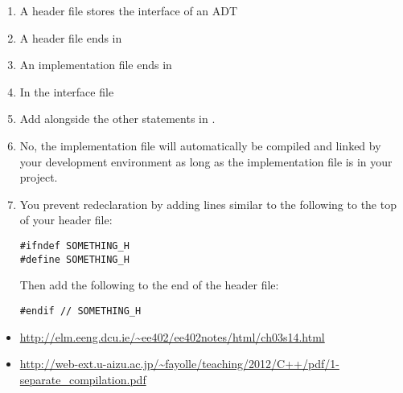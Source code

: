 
\begin{enumerate}
	\item A header file stores the interface of an ADT

	\item A header file ends in 

	\item An implementation file ends in 

	\item In the interface file

	\item Add  alongside the other  statements in .

	\item No, the implementation file will automatically be compiled and linked by your development environment as long as the implementation file is in your project.

	\item You prevent redeclaration by adding lines similar to the following to the top of your header file:

\noindent\begin{minipage}{\linewidth}\begin{lstlisting}
#ifndef SOMETHING_H
#define SOMETHING_H
\end{lstlisting}\end{minipage}

\noindent Then add the following to the end of the header file:

\noindent\begin{minipage}{\linewidth}\begin{lstlisting}
#endif // SOMETHING_H
\end{lstlisting}\end{minipage}

\end{enumerate}


\begin{itemize}
\item \url{http://elm.eeng.dcu.ie/~ee402/ee402notes/html/ch03s14.html}
\item \url{http://web-ext.u-aizu.ac.jp/~fayolle/teaching/2012/C++/pdf/1-separate_compilation.pdf}
\end{itemize}	
